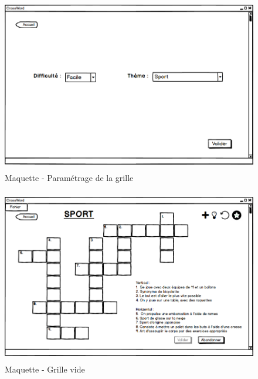 \documentclass [ 11 pt ] {article}
\begin{document}
    \begin{figure}[H]
    \begin{center}
        \includegraphics[height=3in]{Maquettes/ChoixThemeDifficulte.png}
        \caption{Maquette - Paramétrage de la grille} 
    \end{center}
    \end{figure}

    \begin{figure}[H]
    \begin{center}
        \includegraphics[height=3in]{Maquettes/Grille_vide.png}
        \caption{Maquette - Grille vide} 
    \end{center}
    \end{figure}
\end{document}
